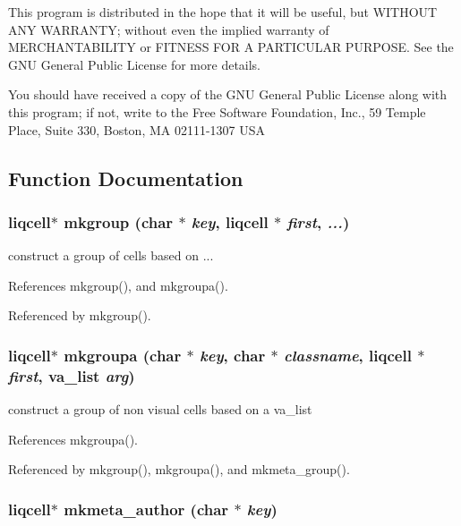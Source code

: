 This program is distributed in the hope that it will be useful, but WITHOUT ANY WARRANTY; without even the implied warranty of MERCHANTABILITY or FITNESS FOR A PARTICULAR PURPOSE. See the GNU General Public License for more details.

You should have received a copy of the GNU General Public License along with this program; if not, write to the Free Software Foundation, Inc., 59 Temple Place, Suite 330, Boston, MA 02111-1307 USA 

\subsection{Function Documentation}
\subsubsection[{mkgroup}]{\setlength{\rightskip}{0pt plus 5cm}liqcell$\ast$ mkgroup (char $\ast$ {\em key}, \/  liqcell $\ast$ {\em first}, \/   {\em ...})}\label{d4/d54/liqcell__mk__star_8c_8f8accc4fe47de9f5fa78df46f4d97a9}


construct a group of cells based on ... 

References mkgroup(), and mkgroupa().

Referenced by mkgroup().
\subsubsection[{mkgroupa}]{\setlength{\rightskip}{0pt plus 5cm}liqcell$\ast$ mkgroupa (char $\ast$ {\em key}, \/  char $\ast$ {\em classname}, \/  liqcell $\ast$ {\em first}, \/  va\_\-list {\em arg})}\label{d4/d54/liqcell__mk__star_8c_608587c6ea778a212270715cf6b81b75}


construct a group of non visual cells based on a va\_\-list 

References mkgroupa().

Referenced by mkgroup(), mkgroupa(), and mkmeta\_\-group().
\subsubsection[{mkmeta\_\-author}]{\setlength{\rightskip}{0pt plus 5cm}liqcell$\ast$ mkmeta\_\-author (char $\ast$ {\em key})}\label{d4/d54/liqcell__mk__star_8c_8a68e85c9acc5a45fa9751fde4f100ae}


